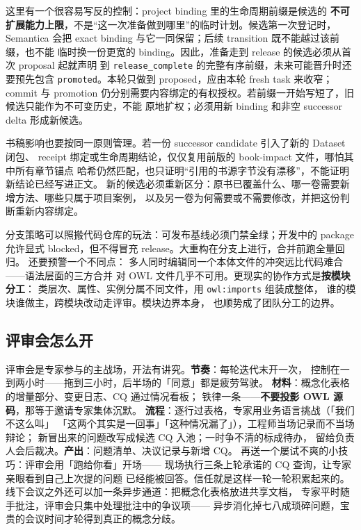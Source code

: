 这里有一个很容易写反的控制：project binding 里的生命周期前缀是候选的
\textbf{不可扩展能力上限}，不是“这一次准备做到哪里”的临时计划。候选第一次登记时，
Semantica 会把 exact binding 与它一同保留；后续 transition 既不能越过该前缀，也不能
临时换一份更宽的 binding。因此，准备走到 release 的候选必须从首次 proposal 起就声明
到 \texttt{release\_complete} 的完整有序前缀，未来可能晋升时还要预先包含
\texttt{promoted}。本轮只做到 proposed，应由本轮 fresh task 来收窄；commit 与 promotion
仍分别需要内容绑定的有权授权。若前缀一开始写短了，旧候选只能作为不可变历史，不能
原地扩权；必须用新 binding 和非空 successor delta 形成新候选。

书稿影响也要按同一原则管理。若一份 successor candidate 引入了新的 Dataset 闭包、
receipt 绑定或生命周期结论，仅仅复用前版的 book-impact 文件，哪怕其中所有章节锚点
哈希仍然匹配，也只证明“引用的书源字节没有漂移”，不能证明新结论已经写进正文。
新的候选必须重新区分：原书已覆盖什么、哪一卷需要新增方法、哪些只属于项目案例，
以及另一卷为何需要或不需要修改，并把这份判断重新内容绑定。

分支策略可以照搬代码仓库的玩法：可发布基线必须门禁全绿；开发中的 package
允许显式 blocked，但不得冒充 release。大重构在分支上进行，合并前跑全量回归。
还要预警一个不同点：
多人同时编辑同一个本体文件的冲突远比代码难合——语法层面的三方合并
对 OWL 文件几乎不可用。更现实的协作方式是\textbf{按模块分工}：
类层次、属性、实例分属不同文件，用 \texttt{owl:imports} 组装成整体，
谁的模块谁做主，跨模块改动走评审。模块边界本身，
也顺势成了团队分工的边界。

\subsection{评审会怎么开}

评审会是专家参与的主战场，开法有讲究。\textbf{节奏}：每轮迭代末开一次，
控制在一到两小时——拖到三小时，后半场的「同意」都是疲劳驾驶。
\textbf{材料}：概念化表格的增量部分、变更日志、CQ 通过情况看板；
铁律一条——\textbf{不要投影 OWL 源码}，那等于邀请专家集体沉默。
\textbf{流程}：逐行过表格，专家用业务语言挑战（「我们不这么叫」
「这两个其实是一回事」「这种情况漏了」），工程师当场记录而不当场辩论；
新冒出来的问题改写成候选 CQ 入池；一时争不清的标成待办，
留给负责人会后裁决。\textbf{产出}：问题清单、决议记录与新增 CQ。
再送一个屡试不爽的小技巧：评审会用「跑给你看」开场——
现场执行三条上轮承诺的 CQ 查询，让专家亲眼看到自己上次提的问题
已经能被回答。信任就是这样一轮一轮积累起来的。
线下会议之外还可以加一条异步通道：把概念化表格放进共享文档，
专家平时随手批注，评审会只集中处理批注中的争议项——
异步消化掉七八成琐碎问题，宝贵的会议时间才轮得到真正的概念分歧。


